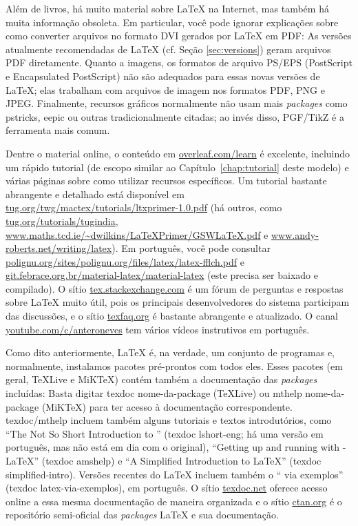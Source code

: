 Além de livros, há muito material sobre \LaTeX{} na Internet, mas também há
muita informação obsoleta. Em particular, você pode ignorar explicações
sobre como converter arquivos no formato DVI gerados por \LaTeX{} em PDF:
As versões atualmente recomendadas de \LaTeX{} (cf. Seção \ref{sec:versions})
geram arquivos PDF diretamente. Quanto a imagens, os formatos de arquivo
PS/EPS (PostScript e Encapsulated PostScript) não são adequados para
essas novas versões de \LaTeX{}; elas trabalham com arquivos de imagem
nos formatos PDF, PNG e JPEG. Finalmente, recursos gráficos normalmente
não usam mais \textit{packages} como \textsf{pstricks}, \textsf{eepic} ou
outras tradicionalmente citadas; ao invés disso, \textsf{PGF/TikZ} é a
ferramenta mais comum.

Dentre o material online, o conteúdo em \url{overleaf.com/learn} é excelente,
incluindo um rápido tutorial (de escopo similar ao Capítulo~\ref{chap:tutorial}
deste modelo) e várias páginas sobre como utilizar recursos específicos. Um
tutorial bastante abrangente e detalhado está disponível em
\url{tug.org/twg/mactex/tutorials/ltxprimer-1.0.pdf} (há outros, como
\url{tug.org/tutorials/tugindia},
\url{www.maths.tcd.ie/~dwilkins/LaTeXPrimer/GSWLaTeX.pdf} e
\url{www.andy-roberts.net/writing/latex}). Em português, você pode consultar
\url{polignu.org/sites/polignu.org/files/latex/latex-fflch.pdf} e
\url{git.febrace.org.br/material-latex/material-latex} (este precisa ser
baixado e compilado). O sítio \url{tex.stackexchange.com} é
um fórum de perguntas e respostas sobre \LaTeX{} muito útil, pois os
principais desenvolvedores do sistema participam das discussões, e o sítio
\url{texfaq.org} é bastante abrangente e atualizado. O canal
\url{youtube.com/c/anteroneves} tem vários vídeos instrutivos em português.

Como dito anteriormente, \LaTeX{} é, na verdade, um conjunto de programas e,
normalmente, instalamos pacotes pré-prontos com todos eles. Esses pacotes (em
geral, \TeX{}Live e MiK\TeX{}) contém também a documentação das
\textit{packages} incluídas: Basta digitar \textsf{texdoc nome-da-package}
(\TeX{}Live) ou \textsf{mthelp nome-da-package} (MiK\TeX{}) para ter acesso à
documentação correspondente. \textsf{texdoc/mthelp} incluem também alguns
tutoriais e textos introdutórios, como ``The Not So Short Introduction to
\LaTeXe{}'' (\textsf{texdoc lshort-eng}; há uma versão em português, mas não
está em dia com o original), ``Getting up and running with \AmS-\LaTeX{}''
(\textsf{texdoc amshelp}) e ``A Simplified Introduction to \LaTeX{}''
(\textsf{texdoc simplified-intro}). Versões recentes do \LaTeX{} incluem
também o ``\LaTeXe{} via exemplos'' (\textsf{texdoc latex-via-exemplos}),
em português. O sítio \url{texdoc.net} oferece acesso online a essa mesma
documentação de maneira organizada e o sítio \url{ctan.org} é o
repositório semi-oficial das \textit{packages} \LaTeX{} e sua documentação.

